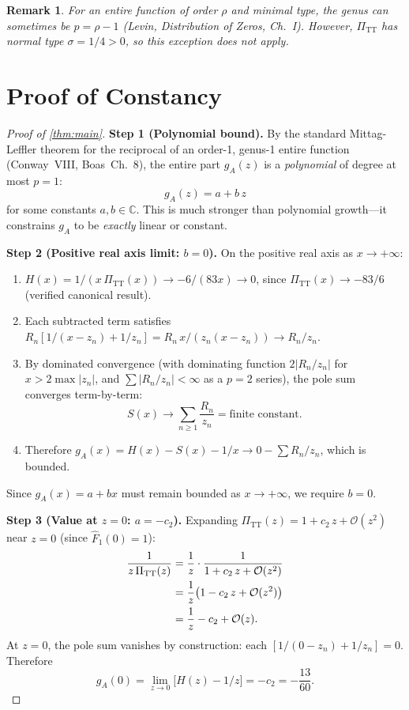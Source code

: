 \documentclass[11pt,a4paper]{article}
\newcommand{\PiTT}{\Pi_{\mathrm{TT}}}
\newcommand{\Fhat}{\hat{F}}
\newcommand{\order}{\mathcal{O}}
\newtheorem{remark}[theorem]{Remark}
\begin{document}
\begin{remark}
  For an entire function of order $\rho$ and minimal type, the genus
  can sometimes be $p = \rho - 1$ (Levin, Distribution of Zeros, Ch.~I).
  However, $\PiTT$ has normal type $\sigma = 1/4 > 0$, so this exception
  does not apply.
\end{remark}

\section{Proof of Constancy}
\label{sec:proof}

\begin{proof}[Proof of \cref{thm:main}]

\textbf{Step 1 (Polynomial bound).}
By the standard Mittag-Leffler theorem for the reciprocal of an
order-1, genus-1 entire function (Conway~VIII, Boas~Ch.~8), the entire
part $g_A(z)$ is a \emph{polynomial} of degree at most $p = 1$:
\begin{equation}\label{eq:gA_poly}
  g_A(z) = a + b\,z
\end{equation}
for some constants $a, b \in \mathbb{C}$.  This is much stronger than
polynomial growth---it constrains $g_A$ to be \emph{exactly} linear or
constant.

\textbf{Step 2 (Positive real axis limit: $b = 0$).}
On the positive real axis as $x \to +\infty$:
\begin{enumerate}[label=(\roman*)]
  \item $H(x) = 1/(x\,\PiTT(x)) \to -6/(83x) \to 0$, since
    $\PiTT(x) \to -83/6$ (verified canonical result).
  \item Each subtracted term satisfies
    $R_n[1/(x - z_n) + 1/z_n] = R_n\,x/(z_n(x - z_n)) \to R_n/z_n$.
  \item By dominated convergence (with dominating function
    $2|R_n/z_n|$ for $x > 2\max|z_n|$, and $\sum|R_n/z_n| < \infty$
    as a $p = 2$ series), the pole sum converges term-by-term:
    \[
      S(x) \to \sum_{n \geq 1} \frac{R_n}{z_n} = \text{finite constant}.
    \]
  \item Therefore $g_A(x) = H(x) - S(x) - 1/x \to 0 - \sum R_n/z_n$,
    which is bounded.
\end{enumerate}
Since $g_A(x) = a + bx$ must remain bounded as $x \to +\infty$,
we require $b = 0$.

\textbf{Step 3 (Value at $z = 0$: $a = -c_2$).}
Expanding $\PiTT(z) = 1 + c_2\,z + \order(z^2)$ near $z = 0$
(since $\Fhat_1(0) = 1$):
\begin{align}
  \frac{1}{z\,\PiTT(z)}
    &= \frac{1}{z}\cdot\frac{1}{1 + c_2\,z + \order(z^2)} \notag\\
    &= \frac{1}{z}\bigl(1 - c_2\,z + \order(z^2)\bigr) \notag\\
    &= \frac{1}{z} - c_2 + \order(z). \label{eq:taylor}
\end{align}
At $z = 0$, the pole sum vanishes by construction:
each $[1/(0 - z_n) + 1/z_n] = 0$.  Therefore
\[
  g_A(0) = \lim_{z \to 0}\bigl[H(z) - 1/z\bigr] = -c_2 = -\frac{13}{60}.
\]


\end{proof}
\end{document}
